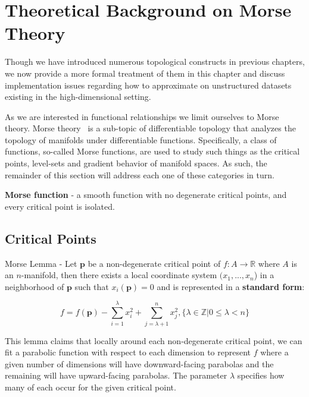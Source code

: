 
\chapter{Theoretical Background on Morse Theory}
\label{ch:theory}

Though we have introduced numerous topological constructs in previous chapters, we now provide a more formal treatment of them in this chapter and discuss implementation issues regarding how to approximate on unstructured datasets existing in the high-dimensional setting.

As we are interested in functional relationships we limit ourselves to Morse theory.
%
Morse theory~\cite{Matsumoto2002,Milnor1973,Morse1949} is a sub-topic of differentiable topology that analyzes the topology of manifolds under differentiable functions.
%
Specifically, a class of functions, so-called Morse functions, are used to study such things as the critical points, level-sets and gradient behavior of manifold spaces.
%
As such, the remainder of this section will address each one of these categories in turn.

\begin{defn}
  \textbf{Morse function} - a smooth function with no degenerate critical points, and every critical point is isolated.
\end{defn}

\section{Critical Points}

\begin{lem} Morse Lemma - Let $\mathbf{p}$ be a non-degenerate critical point of $f : A \rightarrow \mathbb{R}$ where $A$ is an $n$-manifold, then there exists a local coordinate system $(x_1,...,x_n$) in a neighborhood of $\mathbf{p}$ such that $x_i(\mathbf{p}) = 0$ and is represented in a \textbf{standard form}:

\begin{equation}
f = f(\mathbf{p}) - \sum_{i=1}^{\lambda}x_i^2 + \sum_{j=\lambda+1}^n x_j^2, \{\lambda \in \mathbb{Z} | 0 \leq \lambda < n\}
\end{equation}
\end{lem}

This lemma claims that locally around each non-degenerate critical point, we can fit a parabolic function with respect to each dimension to represent $f$ where a given number of dimensions will have downward-facing parabolas and the remaining will have upward-facing parabolas.
%
The parameter $\lambda$ specifies how many of each occur for the given critical point.

